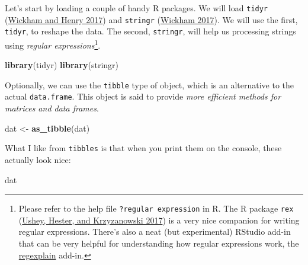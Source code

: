\documentclass[
]{book}
\newenvironment{Shaded}{\begin{snugshade}}{\end{snugshade}}
\newcommand{\FunctionTok}[1]{\textcolor[rgb]{0.13,0.29,0.53}{\textbf{#1}}}
\newcommand{\NormalTok}[1]{#1}
\newcommand{\OtherTok}[1]{\textcolor[rgb]{0.56,0.35,0.01}{#1}}
\begin{document}
Let's start by loading a couple of handy R packages. We will load \texttt{tidyr} (\protect\hyperlink{ref-R-tidyr}{Wickham and Henry 2017}) and \texttt{stringr} (\protect\hyperlink{ref-R-stringr}{Wickham 2017}). We will use the first, \texttt{tidyr}, to reshape the data. The second, \texttt{stringr}, will help us processing strings using \emph{regular expressions}\footnote{Please refer to the help file \texttt{?\textquotesingle{}regular\ expression\textquotesingle{}} in R. The R package \texttt{rex} (\protect\hyperlink{ref-R-rex}{Ushey, Hester, and Krzyzanowski 2017}) is a very nice companion for writing regular expressions. There's also a neat (but experimental) RStudio add-in that can be very helpful for understanding how regular expressions work, the \href{https://github.com/gadenbuie/regexplain}{regexplain} add-in.}.

\begin{Shaded}
\begin{Highlighting}[]
\FunctionTok{library}\NormalTok{(tidyr)}
\FunctionTok{library}\NormalTok{(stringr)}
\end{Highlighting}
\end{Shaded}

Optionally, we can use the \texttt{tibble} type of object, which is an alternative to the actual \texttt{data.frame}. This object is said to provide \emph{more efficient methods for matrices and data frames}.

\begin{Shaded}
\begin{Highlighting}[]
\NormalTok{dat }\OtherTok{\textless{}{-}} \FunctionTok{as\_tibble}\NormalTok{(dat)}
\end{Highlighting}
\end{Shaded}

What I like from \texttt{tibbles} is that when you print them on the console, these actually look nice:

\begin{Shaded}
\begin{Highlighting}[]
\NormalTok{dat}
\end{Highlighting}
\end{Shaded}
\end{document}
